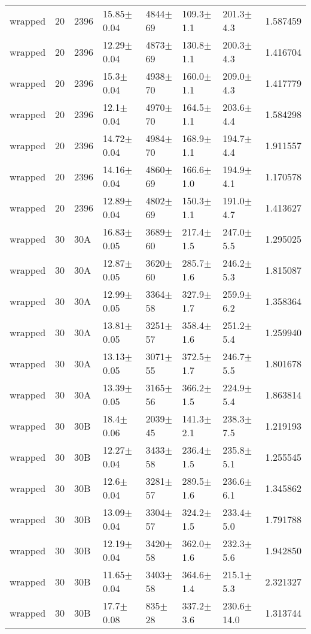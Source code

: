 \begin{tabular}{lrlllllr}
      wrapped &      20 &    2396 &   15.85$\pm$0.04 &  4844$\pm$69 &   109.3$\pm$1.1 &   201.3$\pm$4.3 &    1.587459 \\
      wrapped &      20 &    2396 &   12.29$\pm$0.04 &  4873$\pm$69 &   130.8$\pm$1.1 &   200.3$\pm$4.3 &    1.416704 \\
      wrapped &      20 &    2396 &    15.3$\pm$0.04 &  4938$\pm$70 &   160.0$\pm$1.1 &   209.0$\pm$4.3 &    1.417779 \\
      wrapped &      20 &    2396 &    12.1$\pm$0.04 &  4970$\pm$70 &   164.5$\pm$1.1 &   203.6$\pm$4.4 &    1.584298 \\
      wrapped &      20 &    2396 &   14.72$\pm$0.04 &  4984$\pm$70 &   168.9$\pm$1.1 &   194.7$\pm$4.4 &    1.911557 \\
      wrapped &      20 &    2396 &   14.16$\pm$0.04 &  4860$\pm$69 &   166.6$\pm$1.0 &   194.9$\pm$4.1 &    1.170578 \\
      wrapped &      20 &    2396 &   12.89$\pm$0.04 &  4802$\pm$69 &   150.3$\pm$1.1 &   191.0$\pm$4.7 &    1.413627 \\
      wrapped &      30 &     30A &   16.83$\pm$0.05 &  3689$\pm$60 &   217.4$\pm$1.5 &   247.0$\pm$5.5 &    1.295025 \\
      wrapped &      30 &     30A &   12.87$\pm$0.05 &  3620$\pm$60 &   285.7$\pm$1.6 &   246.2$\pm$5.3 &    1.815087 \\
      wrapped &      30 &     30A &   12.99$\pm$0.05 &  3364$\pm$58 &   327.9$\pm$1.7 &   259.9$\pm$6.2 &    1.358364 \\
      wrapped &      30 &     30A &   13.81$\pm$0.05 &  3251$\pm$57 &   358.4$\pm$1.6 &   251.2$\pm$5.4 &    1.259940 \\
      wrapped &      30 &     30A &   13.13$\pm$0.05 &  3071$\pm$55 &   372.5$\pm$1.7 &   246.7$\pm$5.5 &    1.801678 \\
      wrapped &      30 &     30A &   13.39$\pm$0.05 &  3165$\pm$56 &   366.2$\pm$1.5 &   224.9$\pm$5.4 &    1.863814 \\
      wrapped &      30 &     30B &    18.4$\pm$0.06 &  2039$\pm$45 &   141.3$\pm$2.1 &   238.3$\pm$7.5 &    1.219193 \\
      wrapped &      30 &     30B &   12.27$\pm$0.04 &  3433$\pm$58 &   236.4$\pm$1.5 &   235.8$\pm$5.1 &    1.255545 \\
      wrapped &      30 &     30B &    12.6$\pm$0.04 &  3281$\pm$57 &   289.5$\pm$1.6 &   236.6$\pm$6.1 &    1.345862 \\
      wrapped &      30 &     30B &   13.09$\pm$0.04 &  3304$\pm$57 &   324.2$\pm$1.5 &   233.4$\pm$5.0 &    1.791788 \\
      wrapped &      30 &     30B &   12.19$\pm$0.04 &  3420$\pm$58 &   362.0$\pm$1.6 &   232.3$\pm$5.6 &    1.942850 \\
      wrapped &      30 &     30B &   11.65$\pm$0.04 &  3403$\pm$58 &   364.6$\pm$1.4 &   215.1$\pm$5.3 &    2.321327 \\
      wrapped &      30 &     30B &    17.7$\pm$0.08 &   835$\pm$28 &   337.2$\pm$3.6 &  230.6$\pm$14.0 &    1.313744 \\
\hline
\end{tabular}



